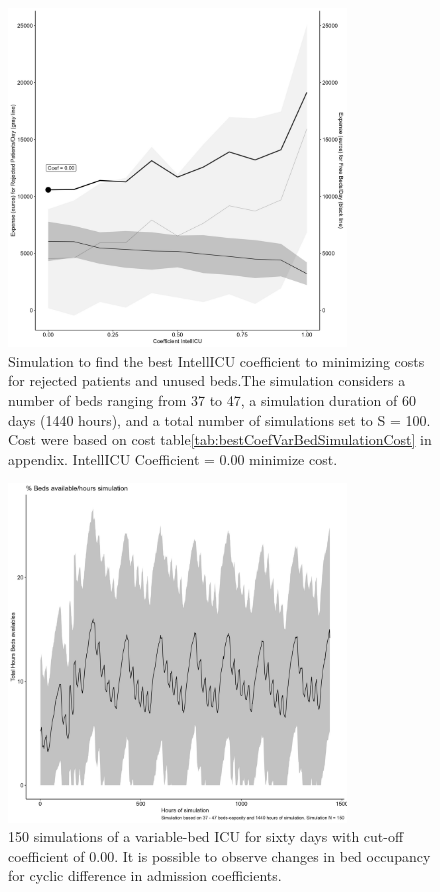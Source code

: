 \documentclass[12pt]{article}
\begin{document}
\begin{figure}[H]
\centering
\includegraphics[width=0.8\textwidth]{Image4.jpeg}
\caption{Simulation to find the best IntellICU coefficient to minimizing costs for rejected patients and unused beds.The simulation considers a number of beds ranging from 37 to 47, a simulation duration of 60 days (1440 hours), and a total number of simulations set to S = 100. Cost were based on cost table\ref{tab:bestCoefVarBedSimulationCost} in appendix. IntellICU Coefficient = 0.00 minimize cost.}
\label{fig:costAnalVarCoefSimulation}
\end{figure}

\begin{figure}[H]
\centering
\includegraphics[width=0.8\textwidth]{Image5.jpeg}
\caption{150 simulations of a variable-bed ICU for sixty days with cut-off coefficient of 0.00. It is possible to observe changes in bed occupancy for cyclic difference in admission coefficients.}
\label{fig:coef0.00bedsSimulation}
\end{figure}

\end{document}
